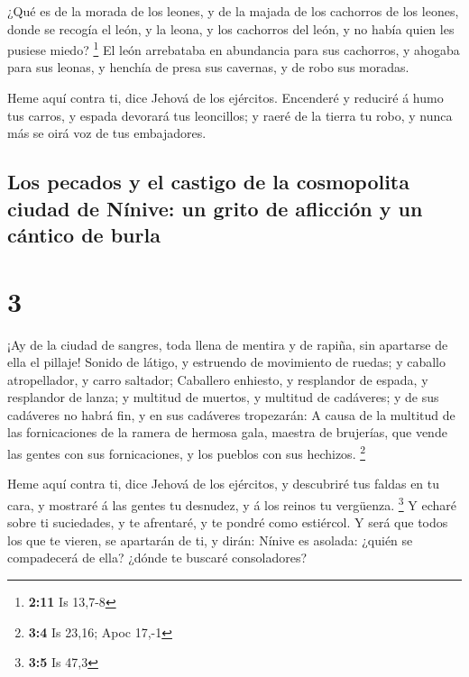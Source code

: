  ¿Qué es de la morada de los leones, y de la majada de los
cachorros de los leones, donde se recogía el león, y la leona, y los
cachorros del león, y no había quien les pusiese miedo? \footnote{\textbf{2:11}
  Is 13,7-8}  El león arrebataba en abundancia para sus
cachorros, y ahogaba para sus leonas, y henchía de presa sus cavernas, y
de robo sus moradas.

 Heme aquí contra ti, dice Jehová de los ejércitos.
Encenderé y reduciré á humo tus carros, y espada devorará tus
leoncillos; y raeré de la tierra tu robo, y nunca más se oirá voz de tus
embajadores.

\hypertarget{los-pecados-y-el-castigo-de-la-cosmopolita-ciudad-de-nuxednive-un-grito-de-aflicciuxf3n-y-un-cuxe1ntico-de-burla}{%
\subsection{Los pecados y el castigo de la cosmopolita ciudad de Nínive:
un grito de aflicción y un cántico de
burla}\label{los-pecados-y-el-castigo-de-la-cosmopolita-ciudad-de-nuxednive-un-grito-de-aflicciuxf3n-y-un-cuxe1ntico-de-burla}}

\hypertarget{section-2}{%
\section{3}\label{section-2}}

 ¡Ay de la ciudad de sangres, toda llena de mentira y de
rapiña, sin apartarse de ella el pillaje!  Sonido de látigo,
y estruendo de movimiento de ruedas; y caballo atropellador, y carro
saltador;  Caballero enhiesto, y resplandor de espada, y
resplandor de lanza; y multitud de muertos, y multitud de cadáveres; y
de sus cadáveres no habrá fin, y en sus cadáveres tropezarán:
 A causa de la multitud de las fornicaciones de la ramera de
hermosa gala, maestra de brujerías, que vende las gentes con sus
fornicaciones, y los pueblos con sus hechizos. \footnote{\textbf{3:4} Is
  23,16; Apoc 17,-1}

 Heme aquí contra ti, dice Jehová de los ejércitos, y
descubriré tus faldas en tu cara, y mostraré á las gentes tu desnudez, y
á los reinos tu vergüenza. \footnote{\textbf{3:5} Is 47,3} 
Y echaré sobre ti suciedades, y te afrentaré, y te pondré como
estiércol.  Y será que todos los que te vieren, se apartarán
de ti, y dirán: Nínive es asolada: ¿quién se compadecerá de ella? ¿dónde
te buscaré consoladores?

